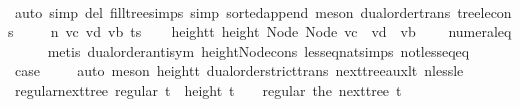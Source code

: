\begin{isabellebody}
\ \ \ \ \isamarkupfalse%
\ {\isacharparenleft}{\kern0pt}auto\ simp\ del{\isacharcolon}{\kern0pt}\ fill{\isacharunderscore}{\kern0pt}tree{\isachardot}{\kern0pt}simps\ simp{\isacharcolon}{\kern0pt}\ sorted{\isacharunderscore}{\kern0pt}append{\isacharcomma}{\kern0pt}\ meson\ dual{\isacharunderscore}{\kern0pt}order{\isachardot}{\kern0pt}trans\ tree{\isacharunderscore}{\kern0pt}le{\isacharunderscore}{\kern0pt}cons{\isacharparenright}{\kern0pt}\isanewline
{}\isamarkupfalse%
\isanewline
\ \ \isamarkupfalse%
\ {\isacharparenleft}{\kern0pt}{}\ n\ vc\ vd\ vb\ ts{\isacharparenright}{\kern0pt}\isanewline
\ \ \isamarkupfalse%
\ height{\isacharunderscore}{\kern0pt}t{\isacharcolon}{\kern0pt}\ {\isachardoublequoteopen}height\ {\isacharparenleft}{\kern0pt}Node\ {\isacharparenleft}{\kern0pt}Node\ {\isacharparenleft}{\kern0pt}vc\ {\isacharhash}{\kern0pt}\ vd{\isacharparenright}{\kern0pt}\ {\isacharhash}{\kern0pt}\ vb{\isacharparenright}{\kern0pt}{\isacharparenright}{\kern0pt}\ {\isasymge}\ {}{\isachardoublequoteclose}\ \isamarkupfalse%
\ numeral{\isacharunderscore}{\kern0pt}{}{\isacharunderscore}{\kern0pt}eq{\isacharunderscore}{\kern0pt}{}\isanewline
\ \ \ \ \isamarkupfalse%
\ {\isacharparenleft}{\kern0pt}metis\ dual{\isacharunderscore}{\kern0pt}order{\isachardot}{\kern0pt}antisym\ height{\isacharunderscore}{\kern0pt}Node{\isacharunderscore}{\kern0pt}cons\ less{\isacharunderscore}{\kern0pt}eq{\isacharunderscore}{\kern0pt}nat{\isachardot}{\kern0pt}simps{\isacharparenleft}{\kern0pt}{}{\isacharparenright}{\kern0pt}\ not{\isacharunderscore}{\kern0pt}less{\isacharunderscore}{\kern0pt}eq{\isacharunderscore}{\kern0pt}eq{\isacharparenright}{\kern0pt}\isanewline
\ \ \isamarkupfalse%
\ \isamarkupfalse%
\ {\isacharquery}{\kern0pt}case\ \isamarkupfalse%
\ {}\ \isamarkupfalse%
\ {\isacharparenleft}{\kern0pt}auto{\isacharcomma}{\kern0pt}\ meson\ height{\isacharunderscore}{\kern0pt}t\ dual{\isacharunderscore}{\kern0pt}order{\isachardot}{\kern0pt}strict{\isacharunderscore}{\kern0pt}trans{}\ next{\isacharunderscore}{\kern0pt}tree{\isacharunderscore}{\kern0pt}aux{\isacharunderscore}{\kern0pt}lt\ nless{\isacharunderscore}{\kern0pt}le{\isacharparenright}{\kern0pt}\isanewline
{}\isamarkupfalse%
%
\endisatagproof
{\isafoldproof}%
%
\isadelimproof
\isanewline
%
\endisadelimproof
\isanewline
{}\isamarkupfalse%
\ regular{\isacharunderscore}{\kern0pt}next{\isacharunderscore}{\kern0pt}tree{\isacharcolon}{\kern0pt}\ {\isachardoublequoteopen}regular\ t\ {\isasymLongrightarrow}\ height\ t\ {\isasymge}\ {}\ {\isasymLongrightarrow}\ regular\ {\isacharparenleft}{\kern0pt}the\ {\isacharparenleft}{\kern0pt}next{\isacharunderscore}{\kern0pt}tree\ t{\isacharparenright}{\kern0pt}{\isacharparenright}{\kern0pt}{\isachardoublequoteclose}\isanewline

\end{isabellebody}
